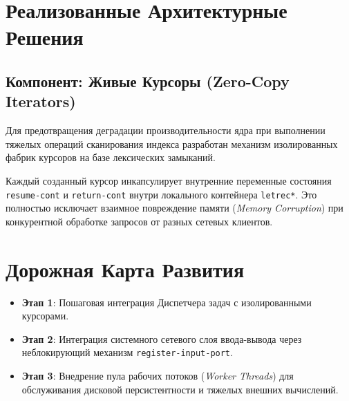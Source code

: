 \documentclass[12pt,a4paper]{article}
\begin{document}
\section{Реализованные Архитектурные Решения}
\subsection{Компонент: Живые Курсоры (Zero-Copy Iterators)}
Для предотвращения деградации производительности ядра при выполнении тяжелых операций сканирования индекса разработан механизм изолированных фабрик курсоров на базе лексических замыканий.

Каждый созданный курсор инкапсулирует внутренние переменные состояния \texttt{resume-cont} и \texttt{return-cont} внутри локального контейнера \texttt{letrec*}. Это полностью исключает взаимное повреждение памяти (\textit{Memory Corruption}) при конкурентной обработке запросов от разных сетевых клиентов.

\section{Дорожная Карта Развития}
\begin{itemize}
    \item \textbf{Этап 1}: Пошаговая интеграция Диспетчера задач с изолированными курсорами.
    \item \textbf{Этап 2}: Интеграция системного сетевого слоя ввода-вывода через неблокирующий механизм \texttt{register-input-port}.
    \item \textbf{Этап 3}: Внедрение пула рабочих потоков (\textit{Worker Threads}) для обслуживания дисковой персистентности и тяжелых внешних вычислений.
\end{itemize}
\end{document}
